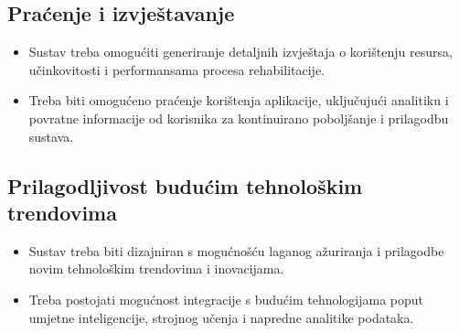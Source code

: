 \subsection*{Praćenje i izvještavanje}
\begin{itemize}
    \item Sustav treba omogućiti generiranje detaljnih izvještaja o korištenju resursa, učinkovitosti i performansama procesa rehabilitacije.
    \item Treba biti omogućeno praćenje korištenja aplikacije, uključujući analitiku i povratne informacije od korisnika za kontinuirano poboljšanje i prilagodbu sustava.
\end{itemize}

\subsection*{Prilagodljivost budućim tehnološkim trendovima}
\begin{itemize}
    \item Sustav treba biti dizajniran s mogućnošću laganog ažuriranja i prilagodbe novim tehnološkim trendovima i inovacijama.
    \item Treba postojati mogućnost integracije s budućim tehnologijama poput umjetne inteligencije, strojnog učenja i napredne analitike podataka.
\end{itemize}


\eject

